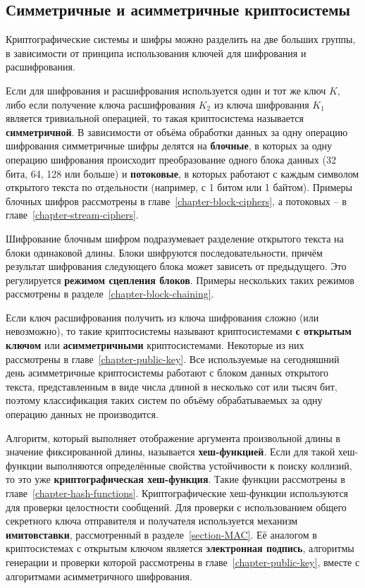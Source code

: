 \subsection{Симметричные и асимметричные криптосистемы}

Криптографические системы и шифры можно разделить на две больших группы, в зависимости от принципа использования ключей для шифрования и расшифрования.

Если для шифрования и расшифрования используется один и тот же ключ $K$, либо если получение ключа расшифрования $K_2$ из ключа шифрования $K_1$ является тривиальной операцией, то такая криптосистема называется \textbf{симметричной}. В зависимости от объёма обработки данных за одну операцию шифрования симметричные шифры делятся на \textbf{блочные}, в которых за одну операцию шифрования происходит преобразование одного блока данных (32 бита, 64, 128 или больше) и \textbf{потоковые}, в которых работают с каждым символом открытого текста по отдельности (например, с 1 битом или 1 байтом). Примеры блочных шифров рассмотрены в главе~\ref{chapter-block-ciphers}, а потоковых -- в главе~\ref{chapter-stream-ciphers}.

Шифрование блочным шифром подразумевает разделение открытого текста на блоки одинаковой длины. Блоки шифруются последовательности, причём результат шифрования следующего блока может зависеть от предыдущего. Это регулируется \textbf{режимом сцепления блоков}. Примеры нескольких таких режимов рассмотрены в разделе~\ref{chapter-block-chaining}.

Если ключ расшифрования получить из ключа шифрования сложно (или невозможно), то такие криптосистемы называют криптосистемами \textbf{с открытым ключом} или \textbf{асимметричными} криптосистемами. Некоторые из них рассмотрены в главе~\ref{chapter-public-key}. Все используемые на сегодняшний день асимметричные криптосистемы работают с блоком данных открытого текста, представленным в виде числа длиной в несколько сот или тысяч бит, поэтому классификация таких систем по объёму обрабатываемых за одну операцию данных не производится.

Алгоритм, который выполняет отображение аргумента произвольной длины в значение фиксированной длины, называется \textbf{хеш-функцией}. Если для такой хеш-функции выполняются определённые свойства устойчивости к поиску коллизий, то это уже \textbf{криптографическая хеш-функция}. Такие функции рассмотрены в главе~\ref{chapter-hash-functions}. Криптографические хеш-функции используются для проверки целостности сообщений. Для проверки с использованием общего секретного ключа отправителя и получателя используется механизм \textbf{имитовставки}, рассмотренный в разделе~\ref{section-MAC}. Её аналогом в криптосистемах с открытым ключом является \textbf{электронная подпись}, алгоритмы генерации и проверки которой рассмотрены в главе~\ref{chapter-public-key}, вместе с алгоритмами асимметричного шифрования.